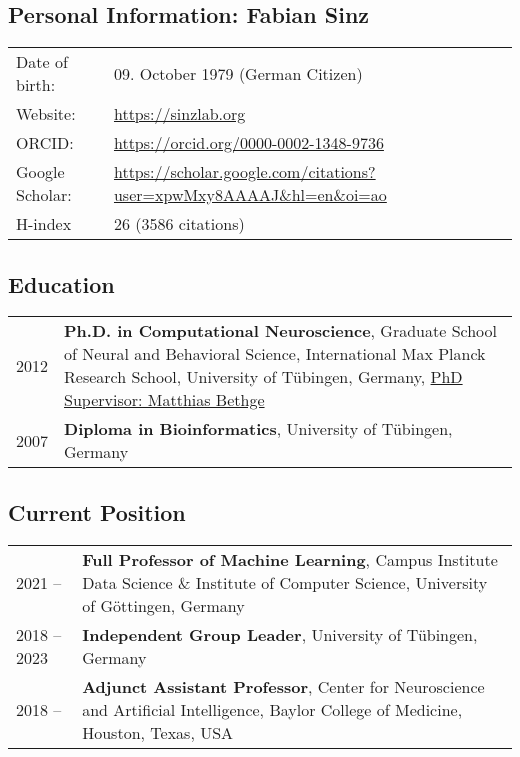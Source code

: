 \documentclass[COG,11pt]{ercgrant}
\begin{document}
\subsection{Personal Information: Fabian Sinz}
\begin{tabular}{p{3cm}l}
	Date of birth:         & 09. October 1979 (German Citizen)     \\
	Website:               & \url{https://sinzlab.org}     \\
	ORCID:                 &  \url{https://orcid.org/0000-0002-1348-9736}      \\
        Google Scholar:         & \url{https://scholar.google.com/citations?user=xpwMxy8AAAAJ&hl=en&oi=ao}\\
        H-index  & 26 (3586 citations)
\end{tabular}

\subsection{Education}
\begin{tabular}{p{3cm}p{12cm}}
	2012
	 & \textbf{Ph.D. in Computational Neuroscience}, Graduate School of Neural and Behavioral Science, International Max Planck Research School, University of Tübingen, Germany, \underline{PhD Supervisor: Matthias Bethge}\\
    2007 & \textbf{Diploma in Bioinformatics}, University of Tübingen, Germany
\end{tabular}

\subsection{Current Position}
\begin{tabular}{p{3cm}p{12cm}}
    2021 -- 
	 & \textbf{Full Professor of Machine Learning}, 
       Campus Institute Data Science \& Institute of Computer Science,
       University of Göttingen, Germany\\
    2018 -- 2023
      & \textbf{Independent Group Leader}, 
       University of Tübingen, Germany\\
    2018 -- 
      & \textbf{Adjunct Assistant Professor},
       Center for Neuroscience and Artificial Intelligence,
       Baylor College of Medicine, Houston, Texas, USA
\end{tabular}
\end{document}
